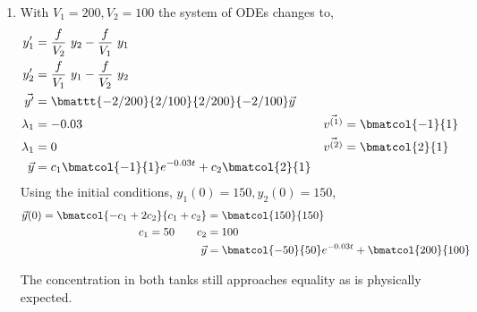 \begin{enumerate}
    \item With $ V_1 = 200, V_2 = 100 $ the system of ODEs changes to,
          \begin{align}
              y_1'          & = \frac{f}{V_2}\ y_2 - \frac{f}{V_1}\ y_1               \\
              y_2'          & = \frac{f}{V_1}\ y_1 - \frac{f}{V_2}\ y_2               \\
              \vec{y'}      & = \bmattt{-2/200}{2/100}{2/200}{-2/100} \vec{y}         \\
              \lambda_1     & = -0.03                                               &
              \vec{v^{(1)}} & = \bmatcol{-1}{1}                                       \\
              \lambda_1     & = 0                                                   &
              \vec{v^{(2)}} & = \bmatcol{2}{1}                                        \\
              \vec{y}       & = c_1 \bmatcol{-1}{1} e^{-0.03t} + c_2 \bmatcol{2}{1}
          \end{align}
          Using the initial conditions, $ y_1(0) = 150, y_2(0) = 150 $,
          \begin{align}
              \vec{y}(0)= \bmatcol{-c_1 + 2c_2}{c_1 + c_2} & = \bmatcol{150}{150} \\
              c_1 = 50 \qquad c_2                          & = 100                \\
              \vec{y}                                      & =
              \bmatcol{-50}{50}e^{-0.03t} + \bmatcol{200}{100}
          \end{align}
          \begin{figure}[H]
              \centering
          \end{figure}
          The concentration in both tanks still approaches equality as is physically
          expected.


\end{enumerate}
